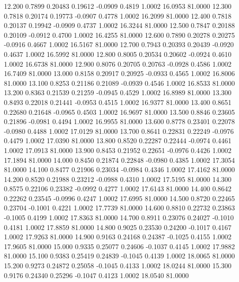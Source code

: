   12.200   0.7899   0.20483   0.19612  -0.0909   0.4819   1.0002  16.0953  81.0000
  12.300   0.7818   0.20174   0.19773  -0.0907   0.4778   1.0002  16.2099  81.0000
  12.400   0.7818   0.20137   0.19942  -0.0909   0.4737   1.0002  16.3244  81.0000
  12.500   0.7847   0.20188   0.20109  -0.0912   0.4700   1.0002  16.4255  81.0000
  12.600   0.7890   0.20278   0.20275  -0.0916   0.4667   1.0002  16.5167  81.0000
  12.700   0.7943   0.20393   0.20439  -0.0920   0.4637   1.0002  16.5992  81.0000
  12.800   0.8005   0.20534   0.20602  -0.0924   0.4610   1.0002  16.6738  81.0000
  12.900   0.8076   0.20705   0.20763  -0.0928   0.4586   1.0002  16.7409  81.0000
  13.000   0.8158   0.20917   0.20925  -0.0933   0.4565   1.0002  16.8006  81.0000
  13.100   0.8253   0.21186   0.21089  -0.0939   0.4546   1.0002  16.8533  81.0000
  13.200   0.8363   0.21539   0.21259  -0.0945   0.4529   1.0002  16.8989  81.0000
  13.300   0.8493   0.22018   0.21441  -0.0953   0.4515   1.0002  16.9377  81.0000
  13.400   0.8651   0.22680   0.21648  -0.0965   0.4503   1.0002  16.9697  81.0000
  13.500   0.8846   0.23605   0.21896  -0.0981   0.4494   1.0002  16.9955  81.0000
  13.600   0.8778   0.23401   0.22078  -0.0980   0.4488   1.0002  17.0129  81.0000
  13.700   0.8641   0.22831   0.22249  -0.0976   0.4479   1.0002  17.0390  81.0000
  13.800   0.8520   0.22287   0.22444  -0.0974   0.4461   1.0002  17.0913  81.0000
  13.900   0.8453   0.21952   0.22651  -0.0976   0.4426   1.0002  17.1894  81.0000
  14.000   0.8450   0.21874   0.22848  -0.0980   0.4385   1.0002  17.3054  81.0000
  14.100   0.8477   0.21906   0.23034  -0.0984   0.4346   1.0002  17.4162  81.0000
  14.200   0.8520   0.21988   0.23212  -0.0988   0.4310   1.0002  17.5195  81.0000
  14.300   0.8575   0.22106   0.23382  -0.0992   0.4277   1.0002  17.6143  81.0000
  14.400   0.8642   0.22262   0.23545  -0.0996   0.4247   1.0002  17.6995  81.0000
  14.500   0.8720   0.22465   0.23704  -0.1001   0.4221   1.0002  17.7739  81.0000
  14.600   0.8810   0.22732   0.23863  -0.1005   0.4199   1.0002  17.8363  81.0000
  14.700   0.8911   0.23076   0.24027  -0.1010   0.4181   1.0002  17.8859  81.0000
  14.800   0.9025   0.23530   0.24200  -0.1017   0.4167   1.0002  17.9263  81.0000
  14.900   0.9163   0.24168   0.24387  -0.1025   0.4155   1.0002  17.9605  81.0000
  15.000   0.9335   0.25077   0.24606  -0.1037   0.4145   1.0002  17.9882  81.0000
  15.100   0.9383   0.25419   0.24839  -0.1045   0.4139   1.0002  18.0065  81.0000
  15.200   0.9273   0.24872   0.25058  -0.1045   0.4133   1.0002  18.0244  81.0000
  15.300   0.9176   0.24340   0.25296  -0.1047   0.4123   1.0002  18.0540  81.0000
